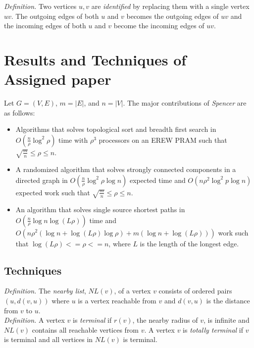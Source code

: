 \documentclass[paper=a4, fontsize=11pt]{scrartcl} %
\numberwithin{equation}{section} %
\numberwithin{figure}{section} %
\numberwithin{table}{section} %
\begin{document}
\textit{Definition.} Two vertices $u,v$ are \textit{identified} by replacing them with a single vertex $uv$. The outgoing edges of both $u$ and $v$ becomes the outgoing edges of $uv$ and the incoming edges of both $u$ and $v$ become the incoming edges of $uv$.


\section{Results and Techniques of Assigned paper}

Let $G = (V,E)$, $m = |E|$, and $n = |V|$. The major contributions of \textit{Spencer\cite{S97}} are as follows:

\begin{itemize}
\item Algorithms that solves topological sort and breadth first search in $O(\frac{n}{\rho}\log^2{\rho})$ time with $\rho^3$ processors on an EREW PRAM such that $ \sqrt{\frac{m}{n}} \leq \rho \leq n$.
\item A randomized algorithm that solves strongly connected components in a directed graph in $O(\frac{n}{\rho}\log^2{\rho}\log{n})$ expected time and $O(n\rho^2\log^2{p}\log{n})$ expected work such that $ \sqrt{\frac{m}{n}} \leq \rho \leq n$.
\item An algorithm that solves single source shortest paths in $O(\frac{n}{\rho}\log{n}\log{(L\rho)})$ time and $O(n\rho^2(\log{n} + \log{(L\rho)}\log{\rho}) + m(\log{n} + \log{(L\rho)}))$ work such that $\log{(L\rho)} <= \rho <= n$, where $L$ is the length of the longest edge.
\end{itemize}

\subsection{Techniques}
\hfill

\textit{Definition.} The \textit{nearby list}, $NL(v)$, of a vertex $v$ consists of ordered pairs $(u, d(v,u))$ where $u$ is a vertex reachable from $v$ and $d(v,u)$ is the distance from $v$ to $u$.\\

\textit{Definition.} A vertex $v$ is \textit{terminal} if $r(v)$, the nearby radius of $v$, is infinite and $NL(v)$ contains all reachable vertices from $v$. A vertex $v$ is \textit{totally terminal} if $v$ is terminal and all vertices in $NL(v)$ is terminal.\\
\end{document}
